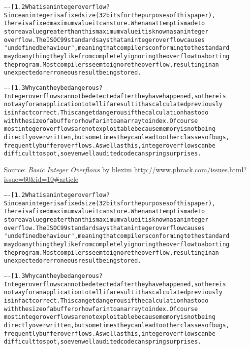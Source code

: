\documentclass[Screen16to9,17pt]{foils}
\begin{document}
\begin{alltt}\footnotesize
----[ 1.2 What is an integer overflow?
Since an integer is a fixed size (32 bits for the purposes of this paper),
there is a fixed maximum value it can store.  When an attempt is made to
store a value greater than this maximum value it is known as an integer
overflow.  The ISO C99 standard says that an integer overflow causes
"undefined behaviour", meaning that compilers conforming to the standard
may do anything they like from completely ignoring the overflow to aborting
the program.  Most compilers seem to ignore the overflow, resulting in an
unexpected or erroneous result being stored.

----[ 1.3 Why can they be dangerous?
Integer overflows cannot be detected after they have happened, so there is
not way for an application to tell if a result it has calculated previously
is in fact correct.  This can get dangerous if the calculation has to do
with the size of a buffer or how far into an array to index.  Of course
most integer overflows are not exploitable because memory is not being
directly overwritten, but sometimes they can lead to other classes of bugs,
frequently buffer overflows.  As well as this, integer overflows can be
difficult to spot, so even well audited code can spring surprises.
\end{alltt}

Source:
\emph{Basic Integer Overflows} by blexim 
\url{http://www.phrack.com/issues.html?issue=60&id=10#article}


\begin{alltt}\footnotesize
----[ 1.2 What is an integer overflow?
Since an integer is a fixed size (32 bits for the purposes of this paper),
there is a fixed maximum value it can store.  When an attempt is made to
store a value greater than this maximum value it is known as an integer
overflow.  The ISO C99 standard says that an integer overflow causes
"undefined behaviour", meaning that compilers conforming to the standard
may do anything they like from completely ignoring the overflow to aborting
the program.  Most compilers seem to ignore the overflow, resulting in an
unexpected or erroneous result being stored.

----[ 1.3 Why can they be dangerous?
Integer overflows cannot be detected after they have happened, so there is
not way for an application to tell if a result it has calculated previously
is in fact correct.  This can get dangerous if the calculation has to do
with the size of a buffer or how far into an array to index.  Of course
most integer overflows are not exploitable because memory is not being
directly overwritten, but sometimes they can lead to other classes of bugs,
frequently buffer overflows.  As well as this, integer overflows can be
difficult to spot, so even well audited code can spring surprises.
\end{alltt}
\end{document}
